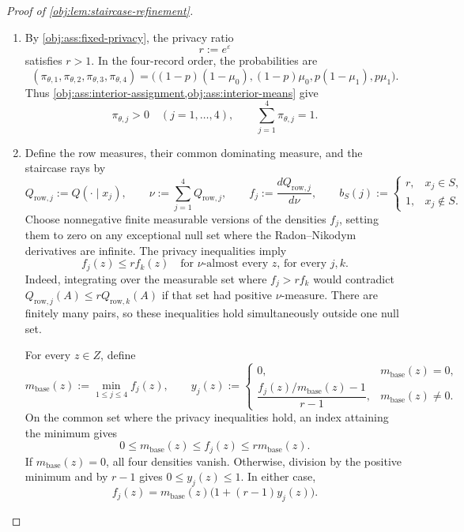 \documentclass[11pt]{article}
\begin{document}
\begin{proof}[Proof of \cref{obj:lem:staircase-refinement}]
\begin{enumerate}
\item
By \cref{obj:ass:fixed-privacy}, the privacy ratio
\[
r:=e^\varepsilon
\]
satisfies \(r>1\). In the four-record order, the probabilities are
\[
(\pi_{\theta,1},\pi_{\theta,2},\pi_{\theta,3},\pi_{\theta,4})
=
\bigl((1-p)(1-\mu_0),(1-p)\mu_0,
      p(1-\mu_1),p\mu_1\bigr).
\]
Thus \cref{obj:ass:interior-assignment,obj:ass:interior-means} give
\[
\pi_{\theta,j}>0\quad(j=1,\ldots,4),
\qquad
\sum_{j=1}^{4}\pi_{\theta,j}=1.
\]

\item
Define the row measures, their common dominating measure, and the staircase rays by
\[
Q_{\mathrm{row},j}:=Q(\cdot\mid x_j),\qquad
\nu:=\sum_{j=1}^{4}Q_{\mathrm{row},j},\qquad
f_j:=\frac{dQ_{\mathrm{row},j}}{d\nu},
\qquad
b_S(j):=
\begin{cases}
r,&x_j\in S,\\
1,&x_j\notin S.
\end{cases}
\]
Choose nonnegative finite measurable versions of the densities \(f_j\), setting them to zero on any exceptional null set where the Radon--Nikodym derivatives are infinite. The privacy inequalities imply
\[
f_j(z)\le r f_k(z)
\quad\text{for \(\nu\)-almost every \(z\), for every \(j,k\)}.
\]
Indeed, integrating over the measurable set where \(f_j>rf_k\) would contradict
\(Q_{\mathrm{row},j}(A)\le rQ_{\mathrm{row},k}(A)\) if that set had positive \(\nu\)-measure. There are finitely many pairs, so these inequalities hold simultaneously outside one null set.

For every \(z\in Z\), define
\[
m_{\mathrm{base}}(z):=\min_{1\le j\le4}f_j(z),
\qquad
y_j(z):=
\begin{cases}
0,&m_{\mathrm{base}}(z)=0,\\[2mm]
\dfrac{f_j(z)/m_{\mathrm{base}}(z)-1}{r-1},
   &m_{\mathrm{base}}(z)\ne0.
\end{cases}
\]
On the common set where the privacy inequalities hold, an index attaining the minimum gives
\[
0\le m_{\mathrm{base}}(z)\le f_j(z)
   \le r m_{\mathrm{base}}(z).
\]
If \(m_{\mathrm{base}}(z)=0\), all four densities vanish. Otherwise, division by the positive minimum and by \(r-1\) gives \(0\le y_j(z)\le1\). In either case,
\[
f_j(z)=m_{\mathrm{base}}(z)\bigl(1+(r-1)y_j(z)\bigr).
\]


\end{enumerate}
\end{proof}
\end{document}
